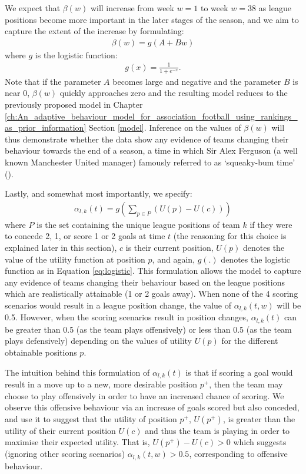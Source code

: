 We expect that \(\beta(w)\) will increase from week \(w = 1\) to week \(w = 38\) as league positions become more
important in the later stages of the season, and we aim to capture the extent of the increase by formulating:
\begin{align} 
\beta(w) = g(A + Bw)
\end{align}
where \(g\) is the logistic function:
\begin{align} 
g(x) = \frac{1}{1 + e^{-x}}.
\label{eq:logistic}
\end{align}
Note that if the parameter \(A\) becomes large and negative and the parameter \(B\) is near 0, \(\beta(w)\) quickly
approaches zero and the resulting model reduces to the previously proposed model in Chapter
\ref{ch:An_adaptive_behaviour_model_for_association_football_using_rankings_as_prior_information} Section \ref{model}.
Inference on the values of \(\beta(w)\) will thus demonstrate whether the data show any evidence of teams changing their
behaviour towards the end of a season, a time in which Sir Alex Ferguson (a well known Manchester United manager)
famously referred to as `squeaky-bum time' (\cite{squeakyBumTime}).

Lastly, and somewhat most importantly, we specify:
\begin{align}
\alpha_{l, k}(t) = g(\sum_{p \in P} (U(p) - U(c)))
\end{align}
where \(P\) is the set containing the unique league positions of team \(k\) if they were to concede 2, 1, or score 1 or
2 goals at time \(t\) (the reasoning for this choice is explained later in this section), \(c\) is their current
position, \(U(p)\) denotes the value of the utility function at position \(p\), and again, \(g(.)\) denotes the logistic
function as in Equation \eqref{eq:logistic}. This formulation allows the model to capture any evidence of teams changing
their behaviour based on the league positions which are realistically attainable (1 or 2 goals away). When none of the 4
scoring scenarios would result in a league position change, the value of \(\alpha_{l, k}(t, w)\) will be 0.5. However,
when the scoring scenarios result in position changes, \(\alpha_{l, k}(t)\) can be greater than 0.5 (as the team plays
offensively) or less than 0.5 (as the team plays defensively) depending on the values of utility \(U(p)\) for the
different obtainable positions \(p\).

The intuition behind this formulation of \(\alpha_{l, k}(t)\) is that if scoring a goal would result in a move up to a
new, more desirable position \(p^{+}\), then the team may choose to play offensively in order to have an increased
chance of scoring. We observe this offensive behaviour via an increase of goals scored but also conceded, and use it to
suggest that the utility of position \(p^{+}\), \(U(p^{+})\), is greater than the utility of their current position
\(U(c)\) and thus the team is playing in order to maximise their expected utility. That is, \(U(p^{+}) - U(c) > 0\)
which suggests (ignoring other scoring scenarios) \(\alpha_{l, k}(t, w) > 0.5\), corresponding to offensive behaviour.

